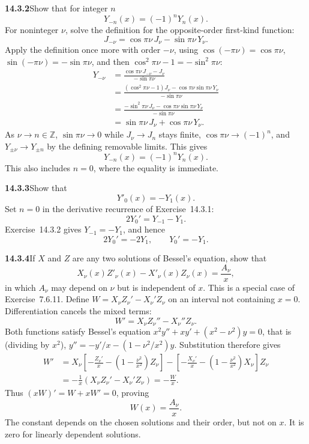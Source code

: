 \par\bigskip
\noindent\textbf{14.3.2}\quad Show that for integer $n$
\[
Y_{-n}(x)=(-1)^{n}Y_{n}(x).
\]
\solution
For noninteger $\nu$, solve the definition for the opposite-order
first-kind function:
\[
J_{-\nu}=\cos\pi\nu\,J_\nu-\sin\pi\nu\,Y_\nu.
\]
Apply the definition once more with order $-\nu$, using
$\cos(-\pi\nu)=\cos\pi\nu$, $\sin(-\pi\nu)=-\sin\pi\nu$, and then
$\cos^2\pi\nu-1=-\sin^2\pi\nu$:
\begin{align*}
Y_{-\nu}
&=\frac{\cos\pi\nu\,J_{-\nu}-J_\nu}{-\sin\pi\nu}\\
&=\frac{(\cos^2\pi\nu-1)J_\nu
-\cos\pi\nu\sin\pi\nu\,Y_\nu}{-\sin\pi\nu}\\
&=\frac{-\sin^2\pi\nu\,J_\nu
-\cos\pi\nu\sin\pi\nu\,Y_\nu}{-\sin\pi\nu}\\
&=\sin\pi\nu\,J_\nu+\cos\pi\nu\,Y_\nu.
\end{align*}
As $\nu\to n\in\mathbb Z$, $\sin\pi\nu\to0$ while $J_\nu\to J_n$
stays finite, $\cos\pi\nu\to(-1)^n$, and $Y_{\pm\nu}\to Y_{\pm n}$
by the defining removable limits. This gives
\[
\boxed{Y_{-n}(x)=(-1)^nY_n(x)}.
\]
This also includes $n=0$, where the equality is immediate.

\par\bigskip
\noindent\textbf{14.3.3}\quad Show that
\[
Y'_{0}(x)=-Y_{1}(x).
\]
\solution
Set $n=0$ in the derivative recurrence of Exercise~14.3.1:
\[
2Y_0'=Y_{-1}-Y_1.
\]
Exercise~14.3.2 gives $Y_{-1}=-Y_1$, and hence
\[
2Y_0'=-2Y_1,\qquad\boxed{Y_0'=-Y_1}.
\]

\par\bigskip
\noindent\textbf{14.3.4}\quad If $X$ and $Z$ are any two solutions of
Bessel's equation, show that
\[
X_{\nu}(x)Z'_{\nu}(x)-X'_{\nu}(x)Z_{\nu}(x)=\frac{A_{\nu}}{x},
\]
in which $A_{\nu}$ may depend on $\nu$ but is independent of $x$. This
is a special case of Exercise~7.6.11.
\solution
Define $W=X_\nu Z_\nu'-X_\nu'Z_\nu$ on an interval not
containing $x=0$. Differentiation cancels the mixed terms:
\[
W'=X_\nu Z_\nu''-X_\nu''Z_\nu.
\]
Both functions satisfy Bessel's equation
$x^2y''+xy'+(x^2-\nu^2)y=0$, that is (dividing by $x^2$),
$y''=-y'/x-(1-\nu^2/x^2)y$. Substitution therefore gives
\begin{align*}
W'&=X_\nu\left[-\frac{Z_\nu'}x-
\left(1-\frac{\nu^2}{x^2}\right)Z_\nu\right]
-\left[-\frac{X_\nu'}x-
\left(1-\frac{\nu^2}{x^2}\right)X_\nu\right]Z_\nu\\
&=-\frac1x(X_\nu Z_\nu'-X_\nu'Z_\nu)=-\frac Wx.
\end{align*}
Thus $(xW)'=W+xW'=0$, proving
\[
\boxed{W(x)=\frac{A_\nu}{x}}.
\]
The constant depends on the chosen solutions and their order, but
not on $x$. It is zero for linearly dependent solutions.

